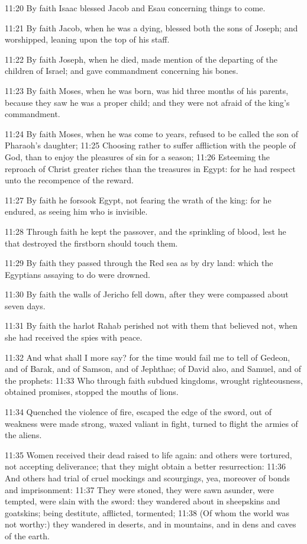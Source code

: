 11:20 By faith Isaac blessed Jacob and Esau concerning things to come.

11:21 By faith Jacob, when he was a dying, blessed both the sons of
Joseph; and worshipped, leaning upon the top of his staff.

11:22 By faith Joseph, when he died, made mention of the departing of
the children of Israel; and gave commandment concerning his bones.

11:23 By faith Moses, when he was born, was hid three months of his
parents, because they saw he was a proper child; and they were not
afraid of the king's commandment.

11:24 By faith Moses, when he was come to years, refused to be called
the son of Pharaoh's daughter; 11:25 Choosing rather to suffer
affliction with the people of God, than to enjoy the pleasures of sin
for a season; 11:26 Esteeming the reproach of Christ greater riches
than the treasures in Egypt: for he had respect unto the recompence of
the reward.

11:27 By faith he forsook Egypt, not fearing the wrath of the king:
for he endured, as seeing him who is invisible.

11:28 Through faith he kept the passover, and the sprinkling of blood,
lest he that destroyed the firstborn should touch them.

11:29 By faith they passed through the Red sea as by dry land: which
the Egyptians assaying to do were drowned.

11:30 By faith the walls of Jericho fell down, after they were
compassed about seven days.

11:31 By faith the harlot Rahab perished not with them that believed
not, when she had received the spies with peace.

11:32 And what shall I more say? for the time would fail me to tell of
Gedeon, and of Barak, and of Samson, and of Jephthae; of David also,
and Samuel, and of the prophets: 11:33 Who through faith subdued
kingdoms, wrought righteousness, obtained promises, stopped the mouths
of lions.

11:34 Quenched the violence of fire, escaped the edge of the sword,
out of weakness were made strong, waxed valiant in fight, turned to
flight the armies of the aliens.

11:35 Women received their dead raised to life again: and others were
tortured, not accepting deliverance; that they might obtain a better
resurrection: 11:36 And others had trial of cruel mockings and
scourgings, yea, moreover of bonds and imprisonment: 11:37 They were
stoned, they were sawn asunder, were tempted, were slain with the
sword: they wandered about in sheepskins and goatskins; being
destitute, afflicted, tormented; 11:38 (Of whom the world was not
worthy:) they wandered in deserts, and in mountains, and in dens and
caves of the earth.

